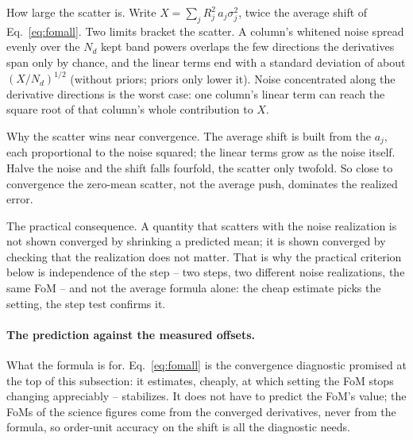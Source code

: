 \documentclass[11pt]{article}
\begin{document}
How large the scatter is.  Write $X = \sum_j R_j^2\,a_j\sigma_j^2$,
twice the average shift of Eq.~\eqref{eq:fomall}.  Two limits bracket
the scatter.  A column's whitened noise spread evenly over the $N_d$
kept band powers overlaps the few directions the derivatives span only
by chance, and the linear terms end with a standard deviation of about
$(X/N_d)^{1/2}$ (without priors; priors only lower it).  Noise
concentrated along the derivative directions is the worst case: one
column's linear term can reach the square root of that column's whole
contribution to $X$.

Why the scatter wins near convergence.  The average shift is built
from the $a_j$, each proportional to the noise squared; the linear
terms grow as the noise itself.  Halve the noise and the shift falls
fourfold, the scatter only twofold.  So close to convergence the
zero-mean scatter, not the average push, dominates the realized error.

The practical consequence.  A quantity that scatters with the noise
realization is not shown converged by shrinking a predicted mean; it
is shown converged by checking that the realization does not matter.
That is why the practical criterion below is independence of the step
-- two steps, two different noise realizations, the same FoM -- and
not the average formula alone: the cheap estimate picks the
setting, the step test confirms it.

\paragraph{The prediction against the measured offsets.}
What the formula is for.  Eq.~\eqref{eq:fomall} is the convergence
diagnostic promised at the top of this subsection: it estimates,
cheaply, at which setting the FoM stops changing appreciably --
stabilizes.  It does not have to predict the FoM's value; the FoMs
of the science figures come from the converged derivatives, never
from the formula, so order-unit accuracy on the shift is all the
diagnostic needs.
\end{document}
